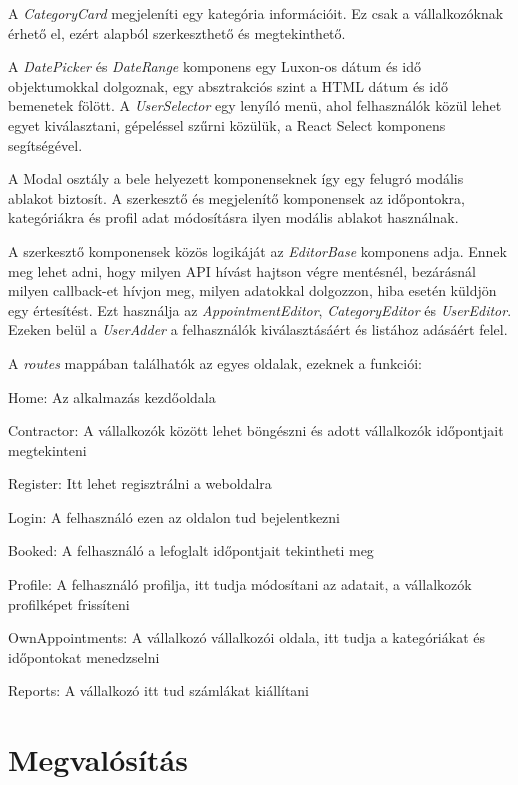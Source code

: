 A \textit{CategoryCard} megjeleníti egy kategória információit. Ez csak a vállalkozóknak érhető el, ezért alapból szerkeszthető és megtekinthető.

A \textit{DatePicker} és \textit{DateRange} komponens egy Luxon-os dátum és idő objektumokkal dolgoznak, egy absztrakciós szint a HTML dátum és idő bemenetek fölött. A \textit{UserSelector} egy lenyíló menü, ahol felhasználók közül lehet egyet kiválasztani, gépeléssel szűrni közülük, a React Select komponens segítségével.

A Modal osztály a bele helyezett komponenseknek így egy felugró modális ablakot biztosít. A szerkesztő és megjelenítő komponensek az időpontokra, kategóriákra és profil adat módosításra ilyen modális ablakot használnak.

A szerkesztő komponensek közös logikáját az \textit{EditorBase} komponens adja. Ennek meg lehet adni, hogy milyen API hívást hajtson végre mentésnél, bezárásnál milyen callback-et hívjon meg, milyen adatokkal dolgozzon, hiba esetén küldjön egy értesítést. Ezt használja az \textit{AppointmentEditor}, \textit{CategoryEditor} és \textit{UserEditor}. Ezeken belül a \textit{UserAdder} a felhasználók kiválasztásáért és listához adásáért felel.

A \textit{routes} mappában találhatók az egyes oldalak, ezeknek a funkciói:

\begin{compactitem}
	\item Home: Az alkalmazás kezdőoldala
	\item Contractor: A vállalkozók között lehet böngészni és adott vállalkozók időpontjait megtekinteni
	\item Register: Itt lehet regisztrálni a weboldalra
	\item Login: A felhasználó ezen az oldalon tud bejelentkezni
	\item Booked: A felhasználó a lefoglalt időpontjait tekintheti meg
	\item Profile: A felhasználó profilja, itt tudja módosítani az adatait, a vállalkozók profilképet frissíteni
	\item OwnAppointments: A vállalkozó vállalkozói oldala, itt tudja a kategóriákat és időpontokat menedzselni
	\item Reports: A vállalkozó itt tud számlákat kiállítani
\end{compactitem}

\clearpage

\section{Megvalósítás}
